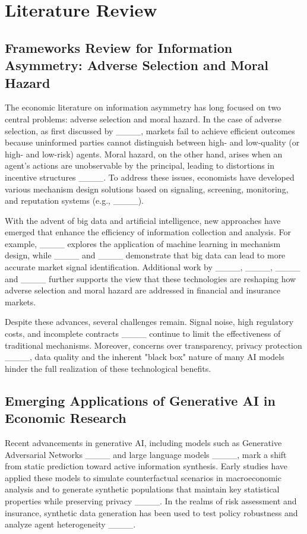 \section{Literature Review}
\subsection{Frameworks Review for Information Asymmetry: Adverse Selection and Moral Hazard}
The economic literature on information asymmetry has long focused on two central problems: adverse selection and moral hazard. In the case of adverse selection, as first discussed by ____, markets fail to achieve efficient outcomes because uninformed parties cannot distinguish between high- and low-quality (or high- and low-risk) agents. Moral hazard, on the other hand, arises when an agent's actions are unobservable by the principal, leading to distortions in incentive structures ____. To address these issues, economists have developed various mechanism design solutions based on signaling, screening, monitoring, and reputation systems (e.g., ____).

With the advent of big data and artificial intelligence, new approaches have emerged that enhance the efficiency of information collection and analysis. For example, ____ explores the application of machine learning in mechanism design, while ____ and ____ demonstrate that big data can lead to more accurate market signal identification. Additional work by ____, ____, ____ and ____ further supports the view that these technologies are reshaping how adverse selection and moral hazard are addressed in financial and insurance markets.

Despite these advances, several challenges remain. Signal noise, high regulatory costs, and incomplete contracts ____ continue to limit the effectiveness of traditional mechanisms. Moreover, concerns over transparency, privacy protection ____, data quality and the inherent "black box" nature of many AI models hinder the full realization of these technological benefits.

\subsection{Emerging Applications of Generative AI in Economic Research}
Recent advancements in generative AI, including models such as Generative Adversarial Networks ____ and large language models ____, mark a shift from static prediction toward active information synthesis. Early studies have applied these models to simulate counterfactual scenarios in macroeconomic analysis and to generate synthetic populations that maintain key statistical properties while preserving privacy ____. In the realms of risk assessment and insurance, synthetic data generation has been used to test policy robustness and analyze agent heterogeneity ____.

